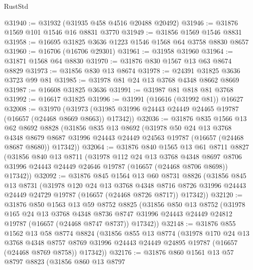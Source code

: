 \begin{lexlean}{RustStd}
\begin{coremodule}
@31940 := @31932 (@31935 @458 @4516 @20488 @20492)
@31946 := @31876 @1569 @101 @1546 @16 @8831 @3770
@31949 := @31856 @1569 @1546 @8831
@31958 := @16695 @31825 @3636 @1223 @1546 @1568 @64 @3758 @8830 @8657
@31960 := @16706 (@16706 @29301)
@31961 := @31958 @31960
@31964 := @31871 @1568 @64 @8830
@31970 := @31876 @830 @1567 @13 @63 @8674 @8829
@31973 := @31856 @830 @13 @8674
@31978 := @24391 @31825 @3636 @3723 @99 @81
@31985 := @31978 @81 @24 @13 @3768 @4348 @8662 @8669
@31987 := @16608 @31825 @3636
@31991 := @31987 @81 @818 @81 @3768
@31992 := @16617 @31825
@31996 := @31991 (@16616 (@31992 @81)) @16627
@32008 := @31970
    (@31973 (@31985 @31996 @24443 @24449 @24465 @19787 (@16657 (@24468 @8669 @8663)) @17342))
@32036 := @31876
    @835
    @1566
    @13
    @62
    @8692
    @8828
    (@31856
      @835
      @13
      @8692
      (@31978
        @50
        @24
        @13
        @3768
        @4348
        @8679
        @8687
        @31996
        @24443
        @24449
        @24563
        @19787
        (@16657 (@24468 @8687 @8680))
        @17342))
@32064 := @31876
    @840
    @1565
    @13
    @61
    @8711
    @8827
    (@31856
      @840
      @13
      @8711
      (@31978
        @112
        @24
        @13
        @3768
        @4348
        @8697
        @8706
        @31996
        @24443
        @24449
        @24646
        @19787
        (@16657 (@24468 @8706 @8698))
        @17342))
@32092 := @31876
    @845
    @1564
    @13
    @60
    @8731
    @8826
    (@31856
      @845
      @13
      @8731
      (@31978
        @120
        @24
        @13
        @3768
        @4348
        @8716
        @8726
        @31996
        @24443
        @24449
        @24729
        @19787
        (@16657 (@24468 @8726 @8717))
        @17342))
@32120 := @31876
    @850
    @1563
    @13
    @59
    @8752
    @8825
    (@31856
      @850
      @13
      @8752
      (@31978
        @165
        @24
        @13
        @3768
        @4348
        @8736
        @8747
        @31996
        @24443
        @24449
        @24812
        @19787
        (@16657 (@24468 @8747 @8737))
        @17342))
@32148 := @31876
    @855
    @1562
    @13
    @58
    @8774
    @8824
    (@31856
      @855
      @13
      @8774
      (@31978
        @170
        @24
        @13
        @3768
        @4348
        @8757
        @8769
        @31996
        @24443
        @24449
        @24895
        @19787
        (@16657 (@24468 @8769 @8758))
        @17342))
@32176 := @31876
    @860
    @1561
    @13
    @57
    @8797
    @8823
    (@31856
      @860
      @13
      @8797

\end{coremodule}
\end{lexlean}
